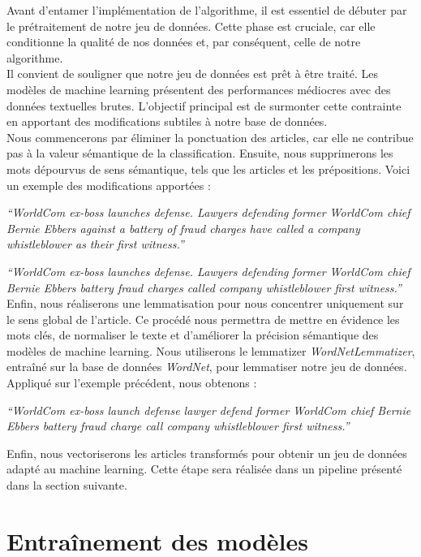 \documentclass[a4paper,12pt]{article}
\begin{document}
Avant d'entamer l'implémentation de l'algorithme, il est essentiel de débuter par le prétraitement de notre jeu de données. Cette phase est cruciale, car elle conditionne la qualité de nos données et, par conséquent, celle de notre algorithme.\\

Il convient de souligner que notre jeu de données est prêt à être traité. Les modèles de machine learning présentent des performances médiocres avec des données textuelles brutes. L'objectif principal est de surmonter cette contrainte en apportant des modifications subtiles à notre base de données.\\

Nous commencerons par éliminer la ponctuation des articles, car elle ne contribue pas à la valeur sémantique de la classification. Ensuite, nous supprimerons les mots dépourvus de sens sémantique, tels que les articles et les prépositions. Voici un exemple des modifications apportées :

\textit{``WorldCom ex-boss launches defense. Lawyers defending former WorldCom chief Bernie Ebbers against a battery of fraud charges have called a company whistleblower as their first witness.''}

\textit{``WorldCom ex-boss launches defense. Lawyers defending former WorldCom chief Bernie Ebbers battery fraud charges called company whistleblower first witness.''}\\

Enfin, nous réaliserons une lemmatisation pour nous concentrer uniquement sur le sens global de l'article. Ce procédé nous permettra de mettre en évidence les mots clés, de normaliser le texte et d'améliorer la précision sémantique des modèles de machine learning. Nous utiliserons le lemmatizer \textit{WordNetLemmatizer}, entraîné sur la base de données \textit{WordNet}, pour lemmatiser notre jeu de données. Appliqué sur l'exemple précédent, nous obtenons :

\textit{``WorldCom ex-boss launch defense lawyer defend former WorldCom chief Bernie Ebbers battery fraud charge call company whistleblower first witness.''}

Enfin, nous vectoriserons les articles transformés pour obtenir un jeu de données adapté au machine learning. Cette étape sera réalisée dans un pipeline présenté dans la section suivante.

\section{Entraînement des modèles}
\end{document}
